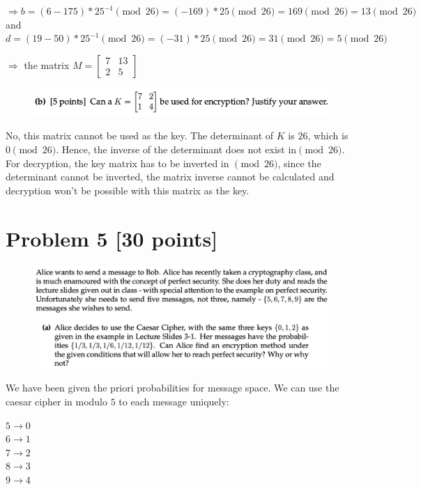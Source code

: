 \documentclass{ashoka-crypto}
\begin{document}
$\Rightarrow b = (6 - 175)*25^{-1} \pmod {26} = (-169)*25 \pmod {26} = 169 \pmod 26 = 13 \pmod {26}$\\
and $d = (19 - 50)*25^{-1} \pmod {26} = (-31)*25 \pmod{26} = 31 \pmod {26} = 5 \pmod {26}$

$\Rightarrow$ the matrix $M = \begin{bmatrix}
7 & 13\\
2 & 5
\end{bmatrix}$

\begin{figure}[h]
\includegraphics[width=17cm]{4b}
\end{figure}

No, this matrix cannot be used as the key. The determinant of $K$ is $26$, which is $0 \pmod{26}$. Hence, the inverse of the determinant does not exist in$\pmod{26}$. For decryption, the key matrix has to be inverted in $\pmod {26}$, since the determinant cannot be inverted, the matrix inverse cannot be calculated and decryption won't be possible with this matrix as the key.

\section*{Problem 5 [30 points]}

\begin{figure}[h]
\includegraphics[width=17cm]{5a}
\end{figure}

We have been given the priori probabilities for message space. We can use the caesar cipher in modulo $5$ to each message uniquely:

$5 \rightarrow 0$\\
$6 \rightarrow 1$\\
$7 \rightarrow 2$\\
$8 \rightarrow 3$\\
$9 \rightarrow 4$
\end{document}
